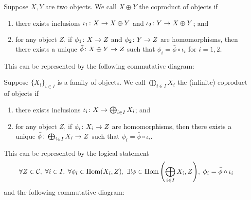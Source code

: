 \begin{definition}
    Suppose \(X,Y\) are two objects.
    We call \(X \oplus Y\) the coproduct of objects if
    \begin{enumerate}[label={(\roman*)}, itemsep=0mm]
        \item there exists inclusions \(\iota_1\colon X\to X \oplus Y\)
            and \(\iota_2\colon Y\to X \oplus Y\); and
        \item for any object \(Z\),
            if \(\phi_1\colon X\to Z\) and \(\phi_2\colon Y\to Z\) are homomorphisms,
            then there exists a unique \(\bar{\phi}\colon X \oplus Y\to Z\)
            such that \(\phi_i = \bar{\phi}\circ\iota_i\) for \(i = 1,2\).
    \end{enumerate}

    This can be represented by the following commutative diagram:
    \begin{center}
    \end{center}
\end{definition}

\begin{definition}
    Suppose \({\{X_i\}}_{i \in I}\) is a family of objects.
    We call \(\bigoplus_{i \in I} X_i\) the (infinite) coproduct of objects if
    \begin{enumerate}[label={(\roman*)}, itemsep=0mm]
        \item there exists inclusions \(\iota_i\colon X\to\bigoplus_{i \in I} X_i\); and
        \item for any object \(Z\),
            if \(\phi_i\colon X_i\to Z\) are homomorphisms,
            then there exists a unique \(\bar{\phi}\colon\bigoplus_{i \in I} X_i\to Z\)
            such that \(\phi_i = \bar{\phi}\circ\iota_i\).
    \end{enumerate}

    This can be represented by the logical statement
    \begin{equation*}
        \forall Z \in \mca{C},\;
        \forall i \in I,\;
        \forall \phi_i \in \Hom(X_i,Z),\;
        \exists! \phi \in \Hom\pqty{\bigoplus_{i \in I} X_i, Z},\;
        \phi_i = \bar{\phi}\circ\iota_i
    \end{equation*}
    and the following commutative diagram:
    \begin{center}
    \end{center}
\end{definition}

